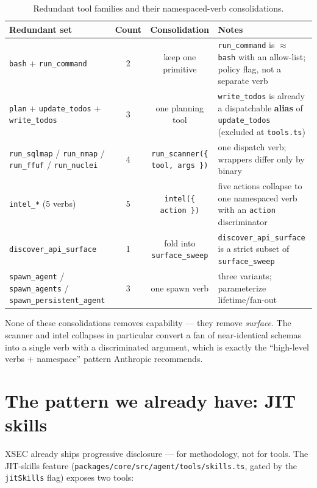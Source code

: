 \documentclass[11pt]{article}
\begin{document}
\begin{table}[ht]
\centering
\small
\begin{tabular}{lccl}
\toprule
Redundant set & Count & Consolidation & Notes \\
\midrule
\texttt{bash} + \texttt{run\_command} & 2 & keep one primitive & \texttt{run\_command} is $\approx$ \texttt{bash} with an allow-list; policy flag, not a separate verb \\
\texttt{plan} + \texttt{update\_todos} + \texttt{write\_todos} & 3 & one planning tool & \texttt{write\_todos} is already a dispatchable \textbf{alias} of \texttt{update\_todos} (excluded at \texttt{tools.ts}) \\
\texttt{run\_sqlmap} / \texttt{run\_nmap} / \texttt{run\_ffuf} / \texttt{run\_nuclei} & 4 & \texttt{run\_scanner(\{ tool, args \})} & one dispatch verb; wrappers differ only by binary \\
\texttt{intel\_*} (5 verbs) & 5 & \texttt{intel(\{ action \})} & five actions collapse to one namespaced verb with an \texttt{action} discriminator \\
\texttt{discover\_api\_surface} & 1 & fold into \texttt{surface\_sweep} & \texttt{discover\_api\_surface} is a strict subset of \texttt{surface\_sweep} \\
\texttt{spawn\_agent} / \texttt{spawn\_agents} / \texttt{spawn\_persistent\_agent} & 3 & one spawn verb & three variants; parameterize lifetime/fan-out \\
\bottomrule
\end{tabular}
\caption{Redundant tool families and their namespaced-verb consolidations.}
\label{tab:redundancy}
\end{table}

None of these consolidations removes capability --- they remove \textit{surface}.
The scanner and intel collapses in particular convert a fan of near-identical
schemas into a single verb with a discriminated argument, which is exactly the
``high-level verbs + namespace'' pattern Anthropic recommends.

\section{The pattern we already have: JIT skills}

XSEC already ships progressive disclosure --- for methodology, not for tools. The
JIT-skills feature (\texttt{packages/core/src/agent/tools/skills.ts}, gated by the
\texttt{jitSkills} flag) exposes two tools:
\end{document}
